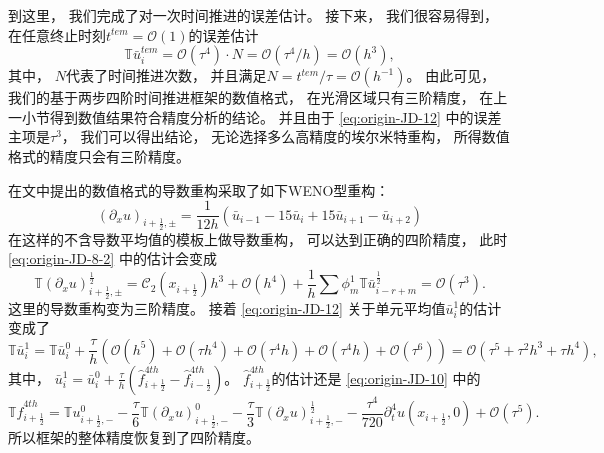 到这里，
我们完成了对一次时间推进的误差估计。
接下来，
我们很容易得到，
在任意终止时刻$t^{tem}={\mathcal{O}}(1)$的误差估计
\begin{equation}
  \label{eq:2D-final-Taylor}
  {\mathbb{T}} \bar{u}_{i}^{tem} = {\mathcal{O}}(\tau^4) \cdot N = {\mathcal{O}}({\tau^4}/{h}) = {\mathcal{O}}(h^3),
\end{equation}
其中，
$N$代表了时间推进次数，
并且满足$N=t^{tem}/\tau={\mathcal{O}}(h^{-1})$。
由此可见，
我们的基于两步四阶时间推进框架的数值格式，
在光滑区域只有三阶精度，
在上一小节得到数值结果符合精度分析的结论。
并且由于 \cref{eq:origin-JD-12} 中的误差主项是$\tau^3$，
我们可以得出结论，
无论选择多么高精度的埃尔米特重构，
所得数值格式的精度只会有三阶精度。

在文\cite{li2016two,du2018hermite}中提出的数值格式的导数重构采取了如下WENO型重构：
\begin{equation}
  \left({\partial_x} u\right)_{i+\frac{1}{2}, \pm}=\frac{1}{12 h}\left(\bar{u}_{i-1}-15 \bar{u}_i+15 \bar{u}_{i+1}-\bar{u}_{i+2}\right)
\end{equation}
在这样的不含导数平均值的模板上做导数重构，
可以达到正确的四阶精度，
此时 \cref{eq:origin-JD-8-2} 中的估计会变成
\begin{equation}
  {\mathbb{T}}\left({\partial_x}u\right)_{i+\frac12,\pm}^{\frac 12} = \mathcal{C}_2(x_{i+\frac{1}{2}})h^3+{\mathcal{O}}(h^{4}) + \frac{1}{h} \sum \phi_m^1 {\mathbb{T}} \bar u_{i-r+m}^{\frac 12} = {\mathcal{O}}(\tau^3).
\end{equation}
这里的导数重构变为三阶精度。
接着 \cref{eq:origin-JD-12} 关于单元平均值$\bar u_{i}^{1}$的估计变成了
\begin{equation}
  \label{eq:origin-JD-13}
  {\mathbb{T}} \bar u_{i}^{1} = {\mathbb{T}} \bar u_{i}^{0} + \frac{\tau}{h} \left(\mathcal{O}(h^5)+\mathcal{O}(\tau h^4)+\mathcal{O}(\tau^4 h)+\mathcal{O}(\tau^4 h)+\mathcal{O}(\tau^6)\right) = {\mathcal{O}}(\tau^5+\tau^2 h^3+\tau h^4),
\end{equation}
其中，
$\bar u_{i}^{1}= \bar u_{i}^{0} + \frac{\tau}{h} \left(\hat{f}^{4th}_{i+\frac 12}-\hat{f}^{4th}_{i-\frac 12}\right)$。
$\hat{f}^{4th}_{i+\frac 12}$的估计还是 \cref{eq:origin-JD-10} 中的
\begin{equation}
  \label{eq:origin-JD-14}
  {\mathbb{T}}\hat{f}^{4th}_{i+\frac 12} = {\mathbb{T}} u_{i+\frac{1}{2},-}^{0}-\frac\tau6 {\mathbb{T}} \left({\partial_{x}} u\right)_{i+\frac 12,-}^{0}-\frac\tau3 {\mathbb{T}} \left({\partial_{x}} u\right)_{i+\frac 12,-}^{\frac{1}{2}} - \frac{\tau^4}{720} {\partial_{t}^4} u(x_{i+\frac 12},0)+{\mathcal{O}}(\tau^5).
\end{equation}
所以框架的整体精度恢复到了四阶精度。

